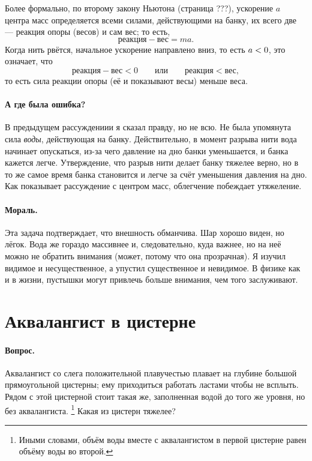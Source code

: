 Более формально, по второму закону Ньютона (страница ???), ускорение $a$ центра масс определяется всеми силами, действующими на банку, их всего две --- реакция опоры (весов) и сам вес; то есть,
\[\text{реакция}-\text{вес}=ma.\]
Когда нить рвётся, начальное ускорение направлено вниз, то есть $a\z<0$, это означает, что
\[
\text{реакция}-\text{вес}<0
\qquad\text{или}\qquad
\text{реакция}<\text{вес},
\]
то есть сила реакции опоры (её и показывают весы) меньше веса.

\paragraph{А где была ошибка?}
В предыдущем рассуждениии я сказал правду, но не всю.
Не была упомянута сила \emph{воды}, действующая на банку.
Действительно, в момент разрыва нити вода начинает опускаться, из-за чего давление на дно банки уменьшается, и банка кажется легче.
Утверждение, что разрыв нити делает банку тяжелее верно, но в то же самое время банка становится и легче за счёт уменьшения давления на дно.
Как показывает рассуждение с центром масс, облегчение побеждает утяжеление.

\paragraph{Мораль.}
Эта задача подтверждает, что внешность обманчива.
Шар хорошо виден, но лёгок.
Вода же гораздо массивнее и, следовательно, куда важнее, но на неё можно не обратить внимания (может, потому что она прозрачная).
Я изучил видимое и несущественное, а упустил существенное и невидимое.
В физике как и в жизни, пустышки могут привлечь больше внимания, чем того заслуживают.

\section{Аквалангист в цистерне}

\paragraph{Вопрос.}
Аквалангист со слега положительной плавучестью плавает на глубине большой прямоугольной цистерны; ему приходиться работать ластами чтобы не всплыть.
Рядом с этой цистерной стоит такая же, заполненная водой до того же уровня, но без аквалангиста.%
\footnote{Иными словами, объём воды вместе с аквалангистом в первой цистерне равен объёму воды во второй.}
Какая из цистерн тяжелее?

